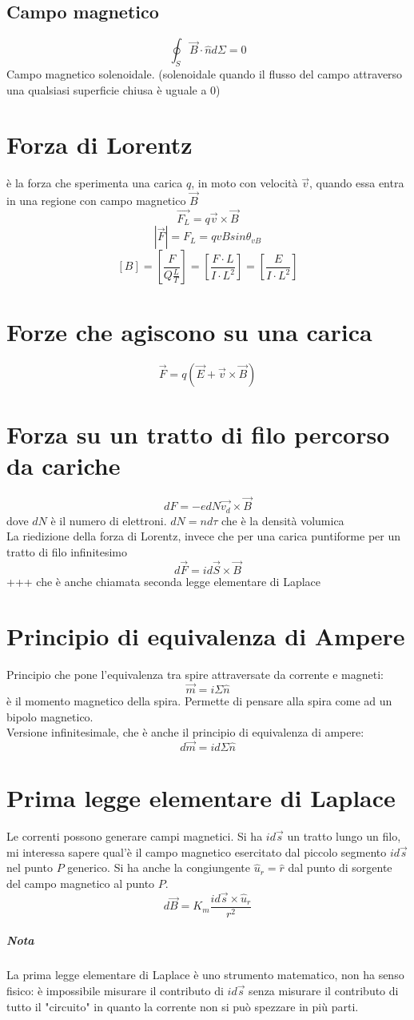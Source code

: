 \documentclass[a4paper]{report}
\begin{document}
  \subsection{Campo magnetico}
  $$ \oint_S \vec{B}\cdot \hat{n} d\Sigma = 0 $$
  Campo magnetico solenoidale. (solenoidale quando il flusso del campo attraverso una qualsiasi superficie chiusa è uguale a 0)

  \section{Forza di Lorentz}
  è la forza che sperimenta una carica $q$, in moto con velocità $\vec{v}$, quando essa entra in una regione con campo magnetico $\vec{B}$
  $$ \vec{F_L} = q\vec{v} \times \vec{B} $$
  $$ |\vec{F}| = F_L = qvB sin\theta_{vB} $$
  $$ [B] = [\frac{F}{Q\frac{L}{T}}] = [\frac{F\cdot L}{I\cdot L^2}] = [\frac{E}{I\cdot L^2}] $$

  \section{Forze che agiscono su una carica}
  $$ \vec{F} = q(\vec{E} + \vec{v} \times \vec{B}) $$

  \section{Forza su un tratto di filo percorso da cariche}
  $$ dF = -e dN \vec{v_d} \times \vec{B}$$
  dove $dN$ è il numero di elettroni. $dN = nd\tau$ che è la densità volumica\\
  La riedizione della forza di Lorentz, invece che per una carica puntiforme per un tratto di filo infinitesimo
  $$ d\vec{F} = i d\vec{S} \times \vec{B} $$+++
  che è anche chiamata seconda legge elementare di Laplace

  \section{Principio di equivalenza di Ampere}
  Principio che pone l'equivalenza tra spire attraversate da corrente e magneti:
  $$ \vec{m} = i \Sigma \hat{n} $$
  è il momento magnetico della spira. Permette di pensare alla spira come ad un bipolo magnetico.\\
  Versione infinitesimale, che è anche il principio di equivalenza di ampere:
  $$ d\vec{m} = id\Sigma \hat{n} $$

  \section{Prima legge elementare di Laplace}
  Le correnti possono generare campi magnetici.
  Si ha $id\vec{s}$ un tratto lungo un filo, mi interessa sapere qual'è il campo magnetico esercitato dal piccolo segmento $id\vec{s}$ nel punto $P$ generico. Si ha anche la congiungente $\hat{u}_r=\hat{r}$ dal punto di sorgente del campo magnetico al punto $P$.
  $$ d\vec{B} = K_m \frac{id\vec{s} \times \hat{u}_r}{r^2} $$
  \subparagraph{Nota}
  La prima legge elementare di Laplace è uno strumento matematico, non ha senso fisico: è impossibile misurare il contributo di $id\vec{s}$ senza misurare il contributo di tutto il "circuito" in quanto la corrente non si può spezzare in più parti.
\end{document}
